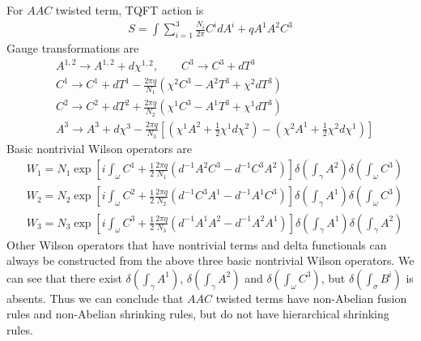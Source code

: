 \documentclass[11pt,nofootinbib,preprint]{revtex4-1}
\begin{document}
For $AAC$ twisted term, TQFT action is 
\begin{align}
	S=\int{\sum_{i=1}^3{\frac{N_i}{2\pi}C^idA^i+qA^1A^2C^3}}
\end{align} 
Gauge transformations are 
\begin{align}
	&A^{1,2}\rightarrow A^{1,2}+d\chi ^{1,2},\qquad C^3\rightarrow C^3+dT^3 \nonumber
	\\
	&C^1\rightarrow C^1+dT^1-\frac{2\pi q}{N_1}\left( \chi ^2C^3-A^2T^3+\chi ^2dT^3 \right) \nonumber
	\\
	&C^2\rightarrow C^2+dT^2+\frac{2\pi q}{N_2}\left( \chi ^1C^3-A^1T^3+\chi ^1dT^3 \right) \nonumber
	\\
	&A^3\rightarrow A^3+d\chi ^3-\frac{2\pi q}{N_3}\left[ \left( \chi ^1A^2+\frac{1}{2}\chi ^1d\chi ^2 \right) - \left( \chi ^2A^1+\frac{1}{2}\chi ^2d\chi ^1 \right)\right]  
\end{align}
Basic nontrivial Wilson operators are
\begin{align}
	&W_1=N_1\exp \left[ i\int_{\omega}{C^1+\frac{1}{2}\frac{2\pi q}{N_1}\left( d^{-1}A^2C^3-d^{-1}C^3A^2 \right)} \right] \delta \left( \int_{\gamma}{A^2} \right) \delta \left( \int_{\omega}{C^3} \right) \nonumber
	\\
	&W_2=N_2\exp \left[ i\int_{\omega}{C^2+\frac{1}{2}\frac{2\pi q}{N_2}\left( d^{-1}C^3A^1-d^{-1}A^1C^3 \right)} \right] \delta \left( \int_{\gamma}{A^1} \right) \delta \left( \int_{\omega}{C^3} \right) \nonumber
	\\
	&W_3=N_3\exp \left[ i\int_{\omega}{C^3+\frac{1}{2}\frac{2\pi q}{N_3}\left( d^{-1}A^1A^2-d^{-1}A^2A^1 \right)} \right] \delta \left( \int_{\gamma}{A^1} \right) \delta \left( \int_{\gamma}{A^2} \right) 
\end{align}
Other Wilson operators that have nontrivial terms and delta functionals can always be constructed from the above three basic nontrivial Wilson operators. We can see that there exist $\delta \left( \int_{\gamma}{A^1}\right)$, $\delta \left( \int_{\gamma}{A^2}\right)$ and $\delta \left( \int_{\omega}{C^3} \right)$, but $\delta \left( \int_{\sigma}{B^i} \right)$ is absents. Thus we can conclude that $AAC$ twisted terms have non-Abelian fusion rules and non-Abelian shrinking rules, but do not have hierarchical shrinking rules.
\end{document}
